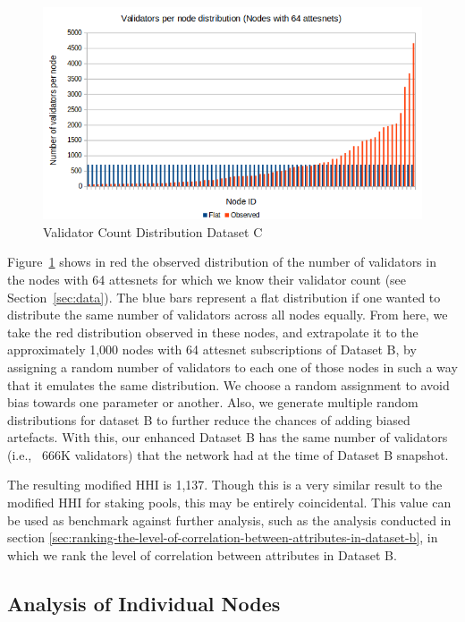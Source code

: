 \documentclass[conference]{IEEEtran}
\begin{document}
\begin{figure}[htbp]
    \centering
    \includegraphics[width=0.95\linewidth]{figures/distC.png}
    \caption{Validator Count Distribution Dataset C}
    \label{fig:datac}
\end{figure}

Figure~\ref{fig:datac} shows in red the observed distribution of the number of validators in the nodes with 64 attesnets for which we know their validator count (see Section~\ref{sec:data}). The blue bars represent a flat distribution if one wanted to distribute the same number of validators across all nodes equally. From here, we take the red distribution observed in these nodes, and extrapolate it to the approximately 1,000 nodes with 64 attesnet subscriptions of Dataset B, by assigning a random number of validators to each one of those nodes in such a way that it emulates the same distribution. We choose a random assignment to avoid bias towards one parameter or another. Also, we generate multiple random distributions for dataset B to further reduce the chances of adding biased artefacts. With this, our enhanced Dataset B has the same number of validators (i.e., ~666K validators) that the network had at the time of Dataset B snapshot.

The resulting modified HHI is 1,137. Though this is a very similar result to the modified HHI for staking pools, this may be entirely coincidental.  This value can be used as benchmark against further analysis, such as the analysis conducted in section \ref{sec:ranking-the-level-of-correlation-between-attributes-in-dataset-b}, in which we rank the level of correlation between attributes in Dataset B.

\subsection{Analysis of Individual Nodes}
\end{document}
